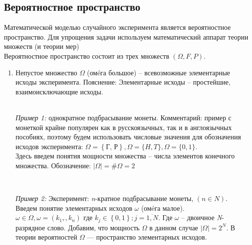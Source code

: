 \documentclass[a4paper, 12pt]{article}
\begin{document}
\subsection{Вероятностное пространство}
Математической моделью случайного эксперимента является вероятностное пространство. Для упрощения задачи используем математический аппарат теории множеств (и теории мер)\\
Вероятностное пространство состоит из трех множеств $\left(\Omega, F, P\right)$.
\begin{enumerate}
\item Непустое множество $\Omega$ (омéга большое) – всевозможные элементарные исходы эксперимента. Пояснение: Элементарные исходы – простейшие, взаимоисключающие исходы. \\
\\
\begin{theorem}
\textit{Пример 1:} однократное подбрасывание монеты. Комментарий: пример с монеткой крайне популярен как в русскоязычных, так и в англоязычных пособиях, поэтому будем использовать числовые значения для обозначения исходов эксперимента: $\Omega=\left\{\text{Г, Р}\right\}, \Omega=\{H,T\}, \Omega=\{0,1\}$.\\
Здесь введем понятия мощности множества – числа элементов конечного множества. Обозначение: $\left|\Omega\right|=\#\Omega=2$\\
\end{theorem}
\\
\begin{theorem}
\textit{Пример 2:} Эксперимент: \textit{n}-кратное подбрасывание монеты, $\left(n\in N\right)$.\\
Введем понятие элементарных исходов $\omega$ (омéга малое).\\
$\omega\in\Omega, \omega=\left(k_1,\dddot{},k_n\right)$ где $k_j\in\left\{0,1\right\};j=\overline{1,N}$. Где $\omega$ – двоичное \textit{N}-разрядное слово. Добавим, что мощность $\Omega$ в данном случае $\left|\Omega\right|=2^N$. В теории вероятностей $\Omega$ — пространство элементарных исходов. 
\end{theorem}
\end{enumerate}
\end{document}
